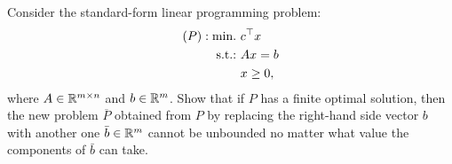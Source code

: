 \noindent Consider the standard-form linear programming problem:
\begin{align*}
	(P) : \mathop{\text{min.~}} & c^\top x \\
	\mathop{\text{s.t.:~}} & Ax = b \\
				& x \ge 0,
\end{align*}
where $A \in \mathbb{R}^{m \times n}$ and $b \in \mathbb{R}^m$. Show that if $P$ has a finite optimal solution, then the new problem $\overline{P}$ obtained from $P$ by replacing the right-hand side vector $b$ with another one $\bar{b} \in \mathbb{R}^m$ cannot be unbounded no matter what value the components of $\bar{b}$ can take.
